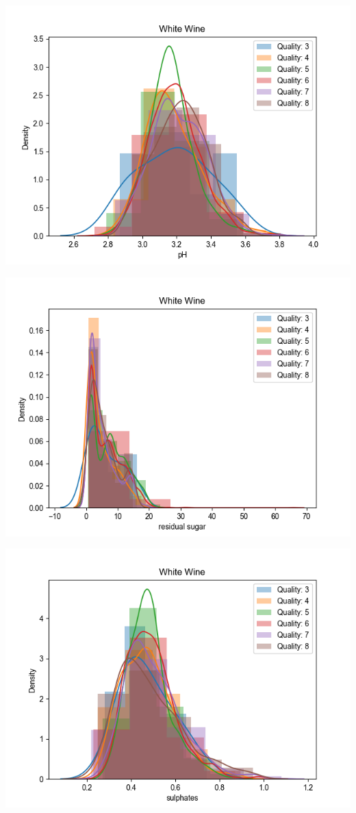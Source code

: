 \documentclass[12pt, letterpaper]{article}
\begin{document}
\includegraphics[scale=\myscale]{white_quality_dist_pH.png}

\includegraphics[scale=\myscale]{white_quality_dist_residual_sugar.png}

\includegraphics[scale=\myscale]{white_quality_dist_sulphates.png}
\end{document}
